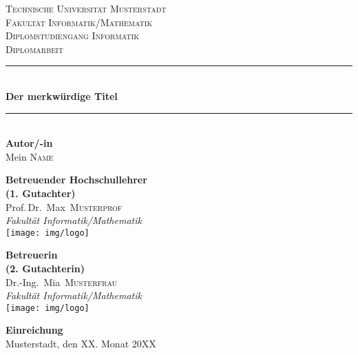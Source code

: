 
\begin{titlepage}
	\begin{center}
	\textsc{\Large Technische Universität Musterstadt}\\[0.5cm]
	\textsc{Fakultät Informatik/Mathematik}\\
	\textsc{Diplomstudiengang Informatik}\\[3cm]
	\textsc{\LARGE Diplomarbeit}\\[0.5cm]
	\newcommand{\HRule}{\rule{\linewidth}{0.5mm}}
	\HRule \\[0.4cm]
	{ \huge \bfseries Der merkwürdige Titel}\\[0.2cm]
	\HRule \\[2cm]
	\textbf{Autor/-in}\\[0.3cm]
	Mein \textsc{Name}\\[2cm]
	\begin{minipage}{0.4\textwidth}
		\begin{flushleft}
			\textbf{Betreuender Hochschullehrer\\(1. Gutachter)}\\[0.3cm]
			Prof.\,Dr.~Max~\textsc{Musterprof}\\
			\emph{Fakultät Informatik/Mathematik}\\[0.2cm]
			\texttt{[image: img/logo]}
		\end{flushleft}
	\end{minipage}
	\hfill
	\begin{minipage}{0.4\textwidth}
		\begin{flushright}
			\textbf{Betreuerin\\(2. Gutachterin)}\\[0.3cm]
			Dr.-Ing.~Mia~\textsc{Musterfrau}\\
			\emph{Fakultät Informatik/Mathematik}\\[0.2cm]
			\texttt{[image: img/logo]}
		\end{flushright}
	\end{minipage}
	\vfill
	\textbf{Einreichung}\\[0.3cm]
	Musterstadt, den XX. Monat 20XX
	\end{center}
\end{titlepage}
